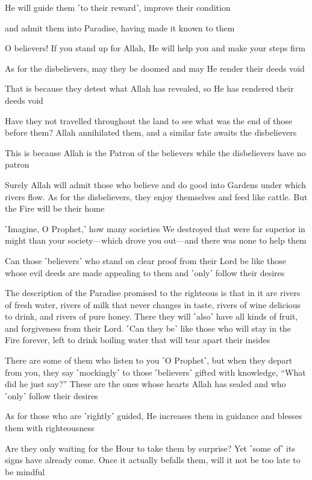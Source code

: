 He will guide them ˹to their reward˺, improve their condition

and admit them into Paradise, having made it known to them

O believers! If you stand up for Allah, He will help you and make your steps firm

As for the disbelievers, may they be doomed and may He render their deeds void

That is because they detest what Allah has revealed, so He has rendered their deeds void

Have they not travelled throughout the land to see what was the end of those before them? Allah annihilated them, and a similar fate awaits the disbelievers

This is because Allah is the Patron of the believers while the disbelievers have no patron

Surely Allah will admit those who believe and do good into Gardens under which rivers flow. As for the disbelievers, they enjoy themselves and feed like cattle. But the Fire will be their home

˹Imagine, O Prophet,˺ how many societies We destroyed that were far superior in might than your society—which drove you out—and there was none to help them

Can those ˹believers˺ who stand on clear proof from their Lord be like those whose evil deeds are made appealing to them and ˹only˺ follow their desires

The description of the Paradise promised to the righteous is that in it are rivers of fresh water, rivers of milk that never changes in taste, rivers of wine delicious to drink, and rivers of pure honey. There they will ˹also˺ have all kinds of fruit, and forgiveness from their Lord. ˹Can they be˺ like those who will stay in the Fire forever, left to drink boiling water that will tear apart their insides

There are some of them who listen to you ˹O Prophet˺, but when they depart from you, they say ˹mockingly˺ to those ˹believers˺ gifted with knowledge, “What did he just say?” These are the ones whose hearts Allah has sealed and who ˹only˺ follow their desires

As for those who are ˹rightly˺ guided, He increases them in guidance and blesses them with righteousness

Are they only waiting for the Hour to take them by surprise? Yet ˹some of˺ its signs have already come. Once it actually befalls them, will it not be too late to be mindful

